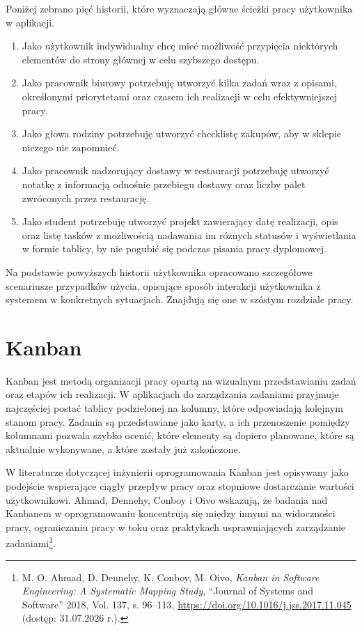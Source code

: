 \documentclass[12pt,a4paper,twoside]{report}
\newcommand{\FirstParagraph}{\noindent\ignorespaces}
\begin{document}
Poniżej zebrano pięć historii, które wyznaczają główne ścieżki pracy użytkownika w aplikacji.

\begin{enumerate}
\item
  Jako użytkownik indywidualny chcę mieć możliwość przypięcia niektórych elementów do strony głównej w celu szybszego dostępu.
\item
  Jako pracownik biurowy potrzebuję utworzyć kilka zadań wraz z opisami, określonymi priorytetami oraz czasem ich realizacji w celu efektywniejszej pracy.
\item
  Jako głowa rodziny potrzebuję utworzyć checklistę zakupów, aby w sklepie niczego nie zapomnieć.
\item
  Jako pracownik nadzorujący dostawy w restauracji potrzebuję utworzyć notatkę z informacją odnośnie przebiegu dostawy oraz liczby palet zwróconych przez restaurację.
\item
  Jako student potrzebuję utworzyć projekt zawierający datę realizacji, opis oraz listę tasków z możliwością nadawania im różnych statusów i wyświetlania w formie tablicy, by nie pogubić się podczas pisania pracy dyplomowej.
\end{enumerate}

Na podstawie powyższych historii użytkownika opracowano szczegółowe scenariusze przypadków użycia, opisujące sposób interakcji użytkownika z systemem w konkretnych sytuacjach. Znajdują się one w szóstym rozdziale pracy.

\section{Kanban}

\FirstParagraph Kanban jest metodą organizacji pracy opartą na wizualnym przedstawianiu zadań oraz etapów ich realizacji. W aplikacjach do zarządzania zadaniami przyjmuje najczęściej postać tablicy podzielonej na kolumny, które odpowiadają kolejnym stanom pracy. Zadania są przedstawiane jako karty, a ich przenoszenie pomiędzy kolumnami pozwala szybko ocenić, które elementy są dopiero planowane, które są aktualnie wykonywane, a które zostały już zakończone.

W literaturze dotyczącej inżynierii oprogramowania Kanban jest opisywany jako podejście wspierające ciągły przepływ pracy oraz stopniowe dostarczanie wartości użytkownikowi. Ahmad, Dennehy, Conboy i Oivo wskazują, że badania nad Kanbanem w oprogramowaniu koncentrują się między innymi na widoczności pracy, ograniczaniu pracy w toku oraz praktykach usprawniających zarządzanie zadaniami\footnote{M. O. Ahmad, D. Dennehy, K. Conboy, M. Oivo, \emph{Kanban in Software Engineering: A Systematic Mapping Study}, ``Journal of Systems and Software'' 2018, Vol. 137, s. 96--113, \url{https://doi.org/10.1016/j.jss.2017.11.045} (dostęp: 31.07.2026 r.).}.
\end{document}
